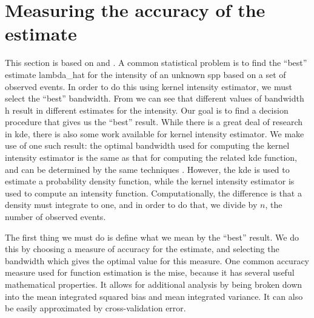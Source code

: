 \section{Measuring the accuracy of the estimate}
\label{sec:theory:accuracy}

This section is based on \citet{silverman1986density} and \citet{wand1994kernel}.
A common statistical problem is to find the ``best'' estimate \gls{lambda_hat}
for the \gls{intensity} of an unknown \gls{spp}
based on a set of observed \glspl{event}.
In order to do this using \gls{kernel intensity estimator},
we must select the ``best'' bandwidth.
From  we can see that different values of bandwidth \gls{h} result in different estimates for the \gls{intensity}.
Our goal is to find a decision procedure that gives us the ``best'' result.
While there is a great deal of research in \gls{kde},
there is also some work available for \gls{kernel intensity estimator}.
We make use of one such result:
the optimal bandwidth used for computing the \gls{kernel intensity estimator} is the same as that for computing the related \gls{kde} function,
and can be determined by the same techniques .
However, the \gls{kde} is used to estimate a probability density function,
while the \gls{kernel intensity estimator} is used to compute an intensity function.
Computationally, the difference is that a density must integrate to one,
and in order to do that,
we divide by $n$,
the number of observed events.


The first thing we must do is define what we mean by the ``best'' result.
We do this by choosing a measure of accuracy for the estimate,
and selecting the bandwidth which gives the optimal value for this measure.
One common accuracy measure used for function estimation is the \gls{mise},
because it has several useful mathematical properties.
It allows for additional analysis by being broken down into the mean integrated squared bias and mean integrated variance.
It can also be easily approximated by cross-validation error.

